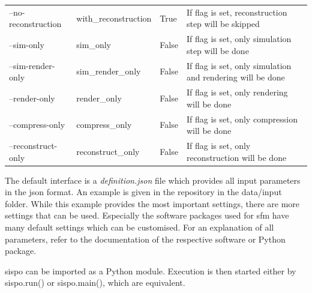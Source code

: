 \begin{table}[htpb]
\begin{tabular}{p{}|p{}|p{}|p{}}
        \multicolumn{1}{l|}{--no-reconstruction} & with\_reconstruction   & True                       & If flag is set,        reconstruction step will be skipped                                                                       \\
        \multicolumn{1}{l|}{--sim-only}          & sim\_only              & False                      & If flag is set,        only simulation step will be done                                                                         \\
        \multicolumn{1}{l|}{--sim-render-only}   & sim\_render\_only      & False                      & If flag is set,        only simulation and rendering will be done                                                                \\
        \multicolumn{1}{l|}{--render-only}       & render\_only           & False                      & If flag is set,        only rendering will be done                                                                               \\
        \multicolumn{1}{l|}{--compress-only}     & compress\_only         & False                      & If flag is set,        only compression will be done                                                                             \\
        \multicolumn{1}{l|}{--reconstruct-only}  & reconstruct\_only      & False                      & If flag is set, only reconstruction will be done       
    \end{tabular}
\end{table}

The default interface is a \textit{definition.json} file which provides all input parameters in the \gls{json} format. An example is given in the repository in the data/input folder. While this example provides the most important settings, there are more settings that can be used. Especially the software packages used for \gls{sfm} have many default settings which can be customised. For an explanation of all parameters, refer to the documentation of the respective software or Python package.

\gls{sispo} can be imported as a Python module. Execution is then started either by sispo.run() or sispo.main(), which are equivalent.

